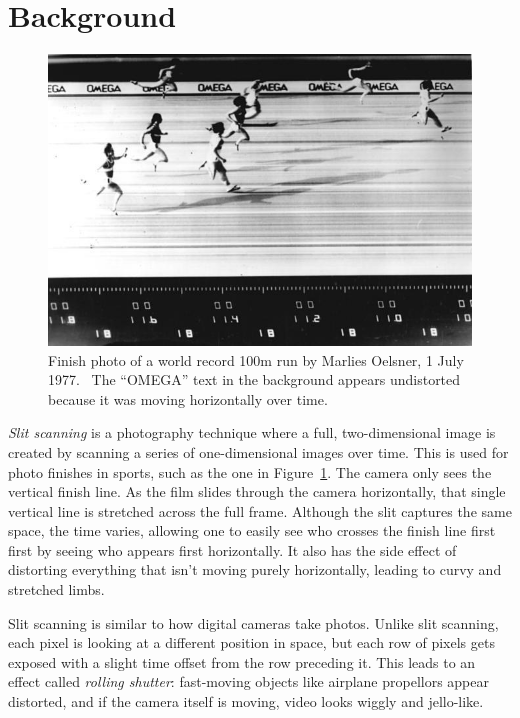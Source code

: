 \documentclass[twocolumn]{article}
\begin{document}
\section{Background}

\begin{figure}
    \includegraphics[width=0.98\linewidth]{img/photofinish.jpg}
    \caption{Finish photo of a world record 100m run by Marlies Oelsner, 1 July 1977.~\cite{photofinish} The ``OMEGA'' text in the background appears undistorted because it was moving horizontally over time.}
    \label{fig:photofinish}
\end{figure}

\textit{Slit scanning} is a photography technique where a full, two-dimensional image is created by scanning a series of one-dimensional images over time. This is used for photo finishes in sports, such as the one in Figure~\ref{fig:photofinish}. The camera only sees the vertical finish line. As the film slides through the camera horizontally, that single vertical line is stretched across the full frame. Although the slit captures the same space, the time varies, allowing one to easily see who crosses the finish line first first by seeing who appears first horizontally. It also has the side effect of distorting everything that isn't moving purely horizontally, leading to curvy and stretched limbs.

Slit scanning is similar to how digital cameras take photos. Unlike slit scanning, each pixel is looking at a different position in space, but each row of pixels gets exposed with a slight time offset from the row preceding it. This leads to an effect called \textit{rolling shutter}: fast-moving objects like airplane propellors appear distorted, and if the camera itself is moving, video looks wiggly and jello-like.~\cite{wikipedia-contributors-2024}
\end{document}
